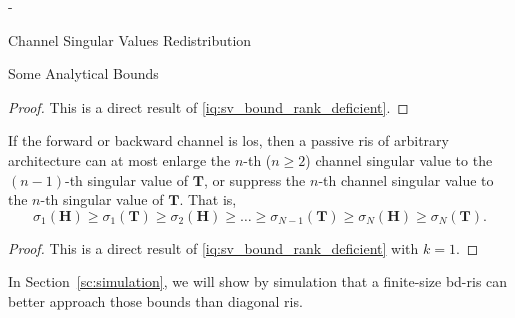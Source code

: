 \begin{section}{-}
\begin{subsection}{Channel Singular Values Redistribution}
\begin{subsubsection}{Some Analytical Bounds}
			\begin{proof}
				This is a direct result of \eqref{iq:sv_bound_rank_deficient}.
			\end{proof}

			\begin{corollary}
				If the forward or backward channel is \gls{los}, then a passive \gls{ris} of arbitrary architecture can at most enlarge the $n$-th ($n \ge 2$) channel singular value to the $(n-1)$-th singular value of $\mathbf{T}$, or suppress the $n$-th channel singular value to the $n$-th singular value of $\mathbf{T}$.
				That is,
				\begin{equation}
					\sigma_1(\mathbf{H}) \ge \sigma_1(\mathbf{T}) \ge {\sigma_2(\mathbf{H})} \ge \ldots \ge \sigma_{N-1}(\mathbf{T}) \ge {\sigma_N(\mathbf{H})} \ge \sigma_N(\mathbf{T}).
					\label{iq:sv_bound_los}
				\end{equation}
			\end{corollary}

			\begin{proof}
				This is a direct result of \eqref{iq:sv_bound_rank_deficient} with $k = 1$.
			\end{proof}

			In Section~\ref{sc:simulation}, we will show by simulation that a finite-size \gls{bd}-\gls{ris} can better approach those bounds than diagonal \gls{ris}.


\end{subsubsection}
\end{subsection}
\end{section}
